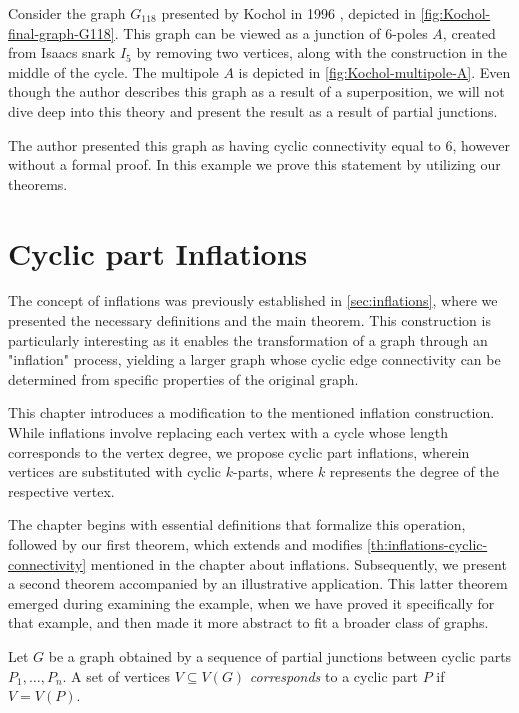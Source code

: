 \documentclass[12pt, twoside]{book}
\begin{document}
\begin{example}
	Consider the graph $G_{118}$ presented by Kochol in 1996 \cite{Kochol1996}, depicted in \cref{fig:Kochol-final-graph-G118}. This graph can be viewed as a junction of 6-poles $A$, created from Isaacs snark $I_5$ \cite{Isaacs1975} by removing two vertices, along with the construction in the middle of the cycle. The multipole $A$ is depicted in \cref{fig:Kochol-multipole-A}. Even though the author describes this graph as a result of a superposition, we will not dive deep into this theory and present the result as a result of partial junctions.
	
	The author presented this graph as having cyclic connectivity equal to 6, however without a formal proof. In this example we prove this statement by utilizing our theorems.
	
\end{example}

\chapter{Cyclic part Inflations}\label{ch:cyclic-part-inflations}

The concept of inflations was previously established in \cref{sec:inflations}, where we presented the necessary definitions and the main theorem. This construction is particularly interesting as it enables the transformation of a graph through an "inflation" process, yielding a larger graph whose cyclic edge connectivity can be determined from specific properties of the original graph.

This chapter introduces a modification to the mentioned inflation construction. While inflations involve replacing each vertex with a cycle whose length corresponds to the vertex degree, we propose cyclic part inflations, wherein vertices are substituted with cyclic $k$-parts, where $k$ represents the degree of the respective vertex.

The chapter begins with essential definitions that formalize this operation, followed by our first theorem, which extends and modifies \cref{th:inflations-cyclic-connectivity} mentioned in the chapter about inflations. Subsequently, we present a second theorem accompanied by an illustrative application. This latter theorem emerged during examining the example, when we have proved it specifically for that example, and then made it more abstract to fit a broader class of graphs.

Let $G$ be a graph obtained by a sequence of partial junctions between cyclic parts $P_1,\dots,P_n$. A set of vertices $V\subseteq V(G)$ \textit{corresponds} to a cyclic part $P$ if $V=V(P)$.
\end{document}
